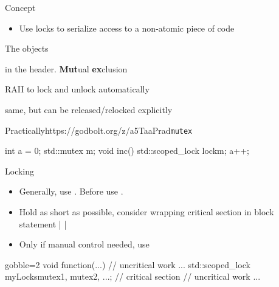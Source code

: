 \begin{frame}[fragile]
  \begin{block}{Concept}
    \begin{itemize}
    \item Use locks to serialize access to a non-atomic piece of code
    \end{itemize}
  \end{block}
  \pause
  \begin{block}{The objects}
    \begin{description}[labelwidth=1.8cm]
    \item[std::mutex] in the  header. \textbf{Mut}ual \textbf{ex}clusion
    \item[std::scoped\_lock] RAII to lock and unlock automatically
    \item[std::unique\_lock] same, but can be released/relocked explicitly
    \end{description}
  \end{block}
  \pause
  \begin{exampleblockGB}{Practically}{https://godbolt.org/z/a5TaaPrad}{\texttt{mutex}}
    \begin{cppcode*}{}
      int a = 0;
      std::mutex m;
      void inc() {
        std::scoped_lock lock{m};
        a++;
      }
    \end{cppcode*}
  \end{exampleblockGB}
\end{frame}

\begin{frame}[fragile]
  \begin{goodpractice}{Locking}
    \begin{itemize}
      \item Generally, use . Before  use .
      \item Hold as short as possible, consider wrapping critical section in block statement \cppinline|{ }|
      \item Only if manual control needed, use 
    \end{itemize}
  \end{goodpractice}
  \begin{exampleblock}{}
    \begin{cppcode*}{gobble=2}
      void function(...) {
        // uncritical work ...
        {
          std::scoped_lock myLocks{mutex1, mutex2, ...};
          // critical section
        }
        // uncritical work ...
      }
    \end{cppcode*}
  \end{exampleblock}
\end{frame}

